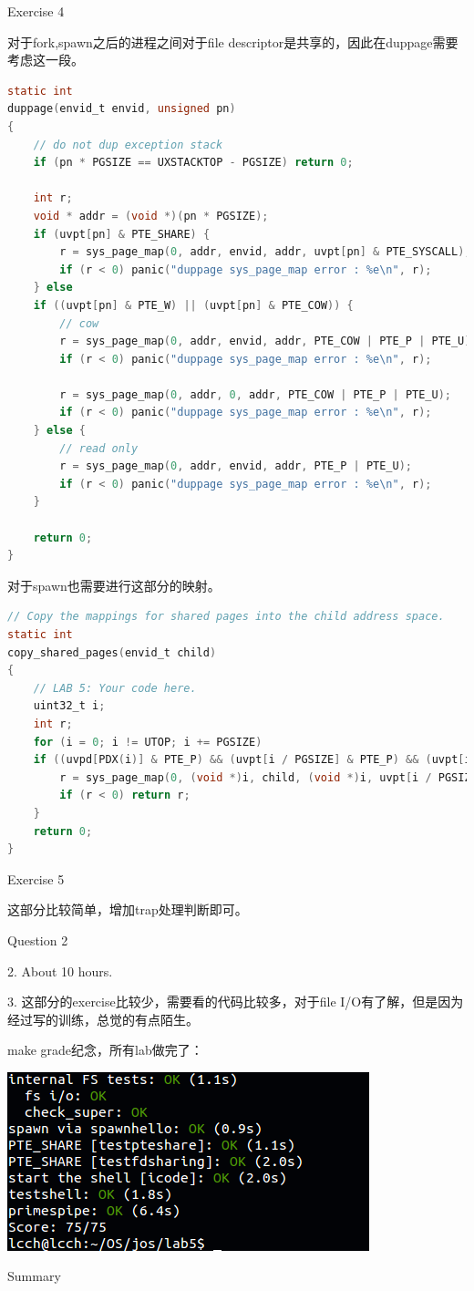 \documentclass[GBK,winfonts,a4paper,10pt]{ctexart}
\begin{document}
\begin{section}{ Exercise 4 }
\par
对于fork,spawn之后的进程之间对于file descriptor是共享的，因此在duppage需要考虑这一段。
\begin{lstlisting}[language = C]
static int
duppage(envid_t envid, unsigned pn)
{
	// do not dup exception stack
	if (pn * PGSIZE == UXSTACKTOP - PGSIZE) return 0;

	int r;
	void * addr = (void *)(pn * PGSIZE);
    if (uvpt[pn] & PTE_SHARE) {
        r = sys_page_map(0, addr, envid, addr, uvpt[pn] & PTE_SYSCALL);
        if (r < 0) panic("duppage sys_page_map error : %e\n", r);
    } else
	if ((uvpt[pn] & PTE_W) || (uvpt[pn] & PTE_COW)) {
		// cow
		r = sys_page_map(0, addr, envid, addr, PTE_COW | PTE_P | PTE_U);
		if (r < 0) panic("duppage sys_page_map error : %e\n", r);
		
		r = sys_page_map(0, addr, 0, addr, PTE_COW | PTE_P | PTE_U);
		if (r < 0) panic("duppage sys_page_map error : %e\n", r);
	} else {
		// read only
		r = sys_page_map(0, addr, envid, addr, PTE_P | PTE_U);
		if (r < 0) panic("duppage sys_page_map error : %e\n", r);
	}

	return 0;
}
\end{lstlisting}
\par
对于spawn也需要进行这部分的映射。
\begin{lstlisting}[language = C]
// Copy the mappings for shared pages into the child address space.
static int
copy_shared_pages(envid_t child)
{
	// LAB 5: Your code here.
    uint32_t i;
    int r;
    for (i = 0; i != UTOP; i += PGSIZE) 
    if ((uvpd[PDX(i)] & PTE_P) && (uvpt[i / PGSIZE] & PTE_P) && (uvpt[i / PGSIZE] & PTE_SHARE)) {
        r = sys_page_map(0, (void *)i, child, (void *)i, uvpt[i / PGSIZE] & PTE_SYSCALL);
        if (r < 0) return r;
    }
	return 0;
}
\end{lstlisting}
\end{section}

\begin{section}{ Exercise 5 }
\par
这部分比较简单，增加trap处理判断即可。
\end{section}

\begin{section}{ Question 2 }
\par
2. About 10 hours.
\par
3. 这部分的exercise比较少，需要看的代码比较多，对于file I/O有了解，但是因为经过写的训练，总觉的有点陌生。
\end{section}

\par
make grade纪念，所有lab做完了：
\par
\includegraphics[scale=0.5]{lab5makegrade.png}
\begin{section}{ Summary }
\end{section}
\end{document}
